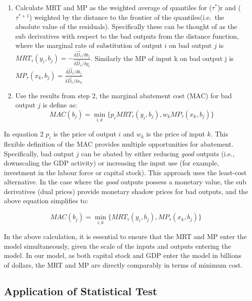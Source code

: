 \documentclass[
  10pt,
]{article}
\begin{document}
\begin{enumerate}
\def\labelenumi{\arabic{enumi}.}
\setcounter{enumi}{1}
\item
  Calculate MRT and MP as the weighted average of quantiles for
  (\(\tau^{*}\))r and (\(\tau^{*+1}\)) weighted by the distance to the
  frontier of the quantiles(i.e.~the absolute value of the residuals).
  Specifically these can be thought of as the sub derivatives with
  respect to the bad outputs from the distance function, where the
  marginal rate of substitution of output \(i\) on bad output \(j\) is
  \(MRT_{\tau}(y_{i},b_{j})=-\frac{\delta \vec{D}_{\tau}/\delta b_{j}}{\delta \vec{D}_{\tau}/\delta y_{i}}\).
  Similarly the MP of input k on bad output j is
  \(MP_{\tau}(x_{k},b_{j})=\frac{\delta \vec{D}_{\tau}/\delta b_{j}}{\delta \vec{D}_{\tau}/\delta x_{k}}\)
\item
  Use the results from step 2, the marginal abatement cost (MAC) for bad
  output \(j\) is define as: \begin{equation}
  MAC(b_{j})=\displaystyle \min_{i,k}\{p_{i}MRT_{\tau}(y_{i},b_{j}), w_{k}MP_{\tau}(x_{k},b_{j})\}
  \end{equation}
\end{enumerate}

In equation 2 \(p_{i}\) is the price of output \(i\) and \(w_{k}\) is
the price of input \(k\). This flexible definition of the MAC provides
multiple opportunities for abatement. Specifically, bad output \(j\) can
be abated by either reducing \emph{good} outputs (i.e., downscaling the
GDP activity) or increasing the input use (for example, investment in
the labour force or capital stock). This approach uses the least-cost
alternative. In the case where the \emph{good} outputs possess a
monetary value, the sub derivatives (dual prices) provide monetary
shadow prices for bad outputs, and the above equation simplifies to:

\begin{equation}
MAC(b_{j})=\displaystyle \min_{i,k}\{MRT_{\tau}(y_{i},b_{j}), MP_{\tau}(x_{k},b_{j})\} 
\end{equation}

In the above calculation, it is essential to ensure that the MRT and MP
enter the model simultaneously, given the scale of the inputs and
outputs entering the model. In our model, as both capital stock and GDP
enter the model in billions of dollars, the MRT and MP are directly
comparably in terms of minimum cost.

\hypertarget{application-of-statistical-test}{%
\subsection{Application of Statistical
Test}\label{application-of-statistical-test}}
\end{document}
